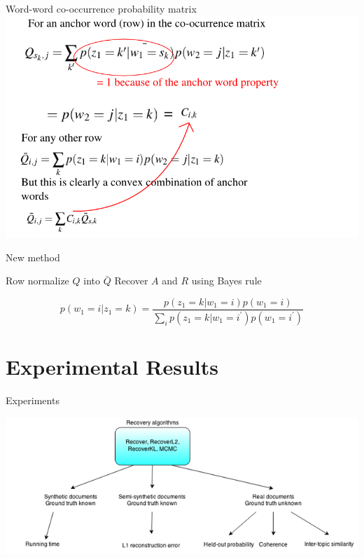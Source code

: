 \documentclass{lecture}
\begin{document}
\begin{plain}{Word-word co-occurrence probability matrix}
\includegraphics[scale=0.5]{figs/Q}
\end{plain}

\begin{plain}{New method}
\begin{itemize}
\p Row normalize $Q$ into $\bar{Q}$
\p Recover $A$ and $R$ using Bayes rule
\end{itemize}
$$p(w_1 = i | z_1 = k) = \frac{p(z_1 = k | w_1 = i)p(w_1 = i)}{\sum_i{p(z_1=k | w_1 = i^\prime)p(w_1=i^\prime)}}$$
\end{plain}

\section[Results]{Experimental Results}
\begin{plain}{Experiments}
\begin{center}
\hspace{-3em}
\includegraphics[scale=0.7]{figs/results_method}
\end{center}
\end{plain}
\end{document}
